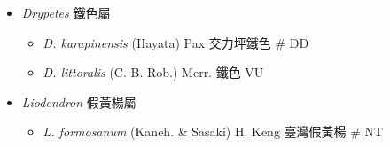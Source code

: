 
  \begin{itemize}
 \item[] \textit{Drypetes} 鐵色屬
                                
  \begin{itemize}
        \item[] \textit{D. karapinensis} (Hayata) Pax  交力坪鐵色  \# DD
        \item[] \textit{D. littoralis} (C. B. Rob.) Merr.  鐵色   VU
  \end{itemize}
 \item[] \textit{Liodendron} 假黃楊屬
                                
  \begin{itemize}
        \item[] \textit{L. formosanum} (Kaneh. \& Sasaki) H. Keng  臺灣假黃楊  \# NT
  \end{itemize}
  \end{itemize}
